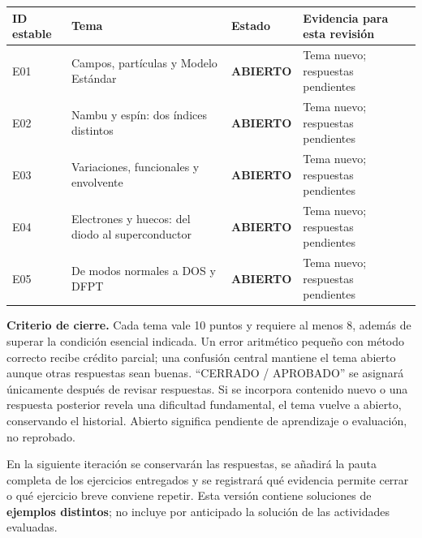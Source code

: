 \documentclass[
  spanish,
  10pt,
  a4paper,
]{article}
\newcounter{none} %
\begin{document}
{\def\LTcaptype{none} %
\begin{longtable}[]{@{}
  >{\raggedright\arraybackslash}p{}
  >{\raggedright\arraybackslash}p{}
  >{\raggedright\arraybackslash}p{}
  >{\raggedright\arraybackslash}p{}@{}}
\toprule\noalign{}
\begin{minipage}[b]{\linewidth}\raggedright
ID estable
\end{minipage} & \begin{minipage}[b]{\linewidth}\raggedright
Tema
\end{minipage} & \begin{minipage}[b]{\linewidth}\raggedright
Estado
\end{minipage} & \begin{minipage}[b]{\linewidth}\raggedright
Evidencia para esta revisión
\end{minipage} \\
\midrule\noalign{}
\endhead
\bottomrule\noalign{}
\endlastfoot
E01 & Campos, partículas y Modelo Estándar & \textbf{ABIERTO} & Tema
nuevo; respuestas pendientes \\
E02 & Nambu y espín: dos índices distintos & \textbf{ABIERTO} & Tema
nuevo; respuestas pendientes \\
E03 & Variaciones, funcionales y envolvente & \textbf{ABIERTO} & Tema
nuevo; respuestas pendientes \\
E04 & Electrones y huecos: del diodo al superconductor &
\textbf{ABIERTO} & Tema nuevo; respuestas pendientes \\
E05 & De modos normales a DOS y DFPT & \textbf{ABIERTO} & Tema nuevo;
respuestas pendientes \\
\end{longtable}
}

\textbf{Criterio de cierre.} Cada tema vale 10 puntos y requiere al
menos 8, además de superar la condición esencial indicada. Un error
aritmético pequeño con método correcto recibe crédito parcial; una
confusión central mantiene el tema abierto aunque otras respuestas sean
buenas. ``CERRADO / APROBADO'' se asignará únicamente después de revisar
respuestas. Si se incorpora contenido nuevo o una respuesta posterior
revela una dificultad fundamental, el tema vuelve a abierto, conservando
el historial. Abierto significa pendiente de aprendizaje o evaluación,
no reprobado.

En la siguiente iteración se conservarán las respuestas, se añadirá la
pauta completa de los ejercicios entregados y se registrará qué
evidencia permite cerrar o qué ejercicio breve conviene repetir. Esta
versión contiene soluciones de \textbf{ejemplos distintos}; no incluye
por anticipado la solución de las actividades evaluadas.
\end{document}
